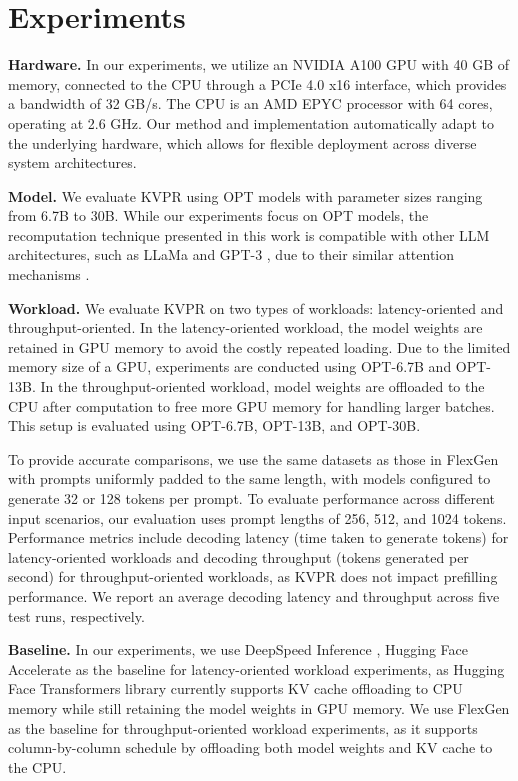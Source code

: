 \documentclass[11pt]{article}
\newcommand{\paperName}{KVPR}
\begin{document}
\section{Experiments}
\label{sec:exp}
\textbf{Hardware.}
In our experiments, we utilize an NVIDIA A100 GPU with 40 GB of memory, connected to the CPU through a PCIe 4.0 x16 interface, which provides a bandwidth of 32 GB/s. The CPU is an AMD EPYC processor with 64 cores, operating at 2.6 GHz.
Our method and implementation automatically adapt to the underlying hardware, which allows for flexible deployment across diverse system architectures.


\noindent \textbf{Model.}
We evaluate {\paperName} using OPT models \cite{zhang2022opt} with parameter sizes ranging from 6.7B to 30B. While our experiments focus on OPT models, the recomputation technique presented in this work is compatible with other LLM architectures, such as LLaMa \cite{touvron2023llama} and GPT-3 \cite{brown2020language}, due to their similar attention mechanisms \cite{ashish2017attention}.

\noindent \textbf{Workload.}
We evaluate {\paperName} on two types of workloads: latency-oriented and throughput-oriented. In the latency-oriented workload, the model weights are retained in GPU memory to avoid the costly repeated loading. Due to the limited memory size of a  GPU, experiments are conducted using OPT-6.7B and OPT-13B. In the throughput-oriented workload, model weights are offloaded to the CPU after computation to free more GPU memory for handling larger batches. This setup is evaluated using OPT-6.7B, OPT-13B, and OPT-30B.

To provide accurate comparisons, we use the same datasets as those in FlexGen \cite{sheng2023flexgen} with prompts uniformly padded to the same length, with models configured to generate 32 or 128 tokens per prompt. To evaluate performance across different input scenarios, our evaluation uses prompt lengths of 256, 512, and 1024 tokens. Performance metrics include decoding latency (time taken to generate tokens) for latency-oriented workloads and decoding throughput (tokens generated per second) for throughput-oriented workloads, as {\paperName} does not impact prefilling performance. We report an average decoding latency and throughput across five test runs, respectively.

\noindent \textbf{Baseline.}
In our experiments, we use DeepSpeed Inference \cite{aminabadi2022deepspeed}, Hugging Face Accelerate \cite{accelerate} as the baseline for latency-oriented workload experiments, as Hugging Face Transformers library currently supports KV cache offloading to CPU memory while still retaining the model weights in GPU memory. We use FlexGen \cite{sheng2023flexgen} as the baseline for throughput-oriented workload experiments, as it supports column-by-column schedule by offloading both model weights and KV cache to the CPU.
\end{document}
